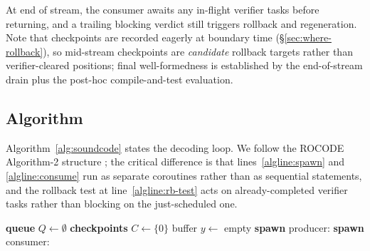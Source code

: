 At end of stream, the consumer awaits any in-flight verifier tasks
before returning, and a trailing blocking verdict still triggers
rollback and regeneration. Note that checkpoints are recorded
eagerly at boundary time (\S\ref{sec:where-rollback}), so
mid-stream checkpoints are \emph{candidate} rollback targets rather
than verifier-cleared positions; final well-formedness is
established by the end-of-stream drain plus the post-hoc
compile-and-test evaluation.

\subsection{Algorithm}\label{sec:algo}

Algorithm~\ref{alg:soundcode} states the decoding loop. We follow
the ROCODE Algorithm-2 structure \citep{jiang2024rocode}; the
critical difference is that lines~\ref{algline:spawn} and
\ref{algline:consume} run as separate coroutines rather than as
sequential statements, and the rollback test at
line~\ref{algline:rb-test} acts on already-completed verifier tasks
rather than blocking on the just-scheduled one.

\begin{algorithm}[t]
\caption{SoundCode asynchronous compiler-supervised decoding.}\label{alg:soundcode}
\textbf{queue} $Q \gets \emptyset$\;
\textbf{checkpoints} $C \gets \{0\}$ 
buffer $y \gets$ empty\;
\textbf{spawn} producer:
\textbf{spawn} consumer:
\end{algorithm}

